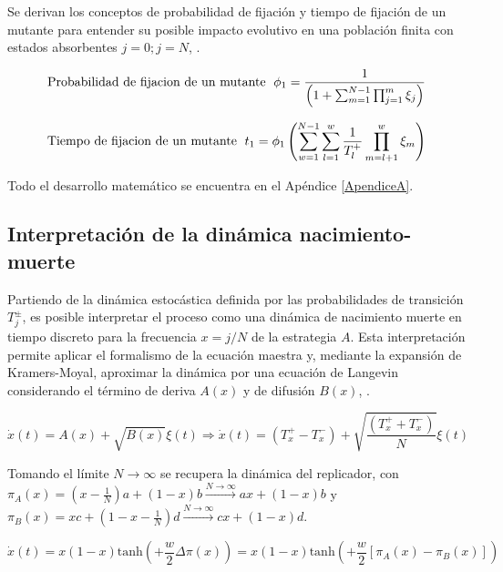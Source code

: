 \documentclass[%
 sor,
 jor,
 amsmath,amssymb,
 reprint,%
]{revtex4-2}
\begin{document}
Se derivan los conceptos de probabilidad de fijación  y tiempo de fijación de un mutante para entender su posible impacto evolutivo en una población finita con estados absorbentes $j=0;j=N$, \cite{Arne}. 

\begin{equation}
    \text{Probabilidad de fijacion de un mutante \hspace{0,1 cm}}\phi_1=\frac{1}{\left(1+\sum_{m=1}^{N-1}\prod_{j=1}^{m}\xi_j \right)}
\end{equation}

\begin{equation}
   \text{Tiempo de fijacion de un mutante \hspace{0,1 cm}} t_1=\phi_1 \left( \sum_{w=1}^{N-1}\sum_{l=1}^{w}\frac{1}{T_l^+}\prod_{m=l+1}^{w}\xi_m \right )
\end{equation}

Todo el desarrollo matemático se encuentra en el Apéndice \ref{ApendiceA}.

\subsection{Interpretación de la dinámica nacimiento-muerte}

Partiendo de la dinámica estocástica definida por las probabilidades de transición \(T_j^\pm\), es posible interpretar el proceso como una dinámica de nacimiento muerte en tiempo discreto para la frecuencia \(x=j/N\) de la estrategia \(A\). Esta interpretación permite aplicar el formalismo de la ecuación maestra y, mediante la expansión de Kramers-Moyal, aproximar la dinámica por una ecuación de Langevin considerando el término de deriva \(A(x)\) y de difusión \(B(x)\), \cite{CalvoTema3}.

\begin{equation}
    \dot{x}(t)=A(x)+\sqrt{B(x)} \xi(t) \Rightarrow \dot{x}(t)=(T_x^+-T_x^-)+\sqrt{\frac{(T_x^++T_x^-)}{N}}\xi(t)
\end{equation}

Tomando el límite $N \xrightarrow{} \infty$ se recupera la dinámica del replicador, con  \(\pi_A(x)=(x-\frac{1}{N})a+(1-x)b \xrightarrow{N\xrightarrow{}\infty}ax + (1 - x)b\) y \(\pi_B(x)=xc+(1-x-\frac{1}{N})d \xrightarrow{N\xrightarrow{}\infty}cx + (1 - x)d \).

\begin{equation}
\dot{x}(t)=x(1-x)\text{tanh}\left(+\frac{w}{2} \Delta \pi(x)\right)=x(1-x)\text{tanh}\left(+\frac{w}{2} \left[\pi_A(x)-\pi_B(x)\right] \right)    
\end{equation}
\end{document}
